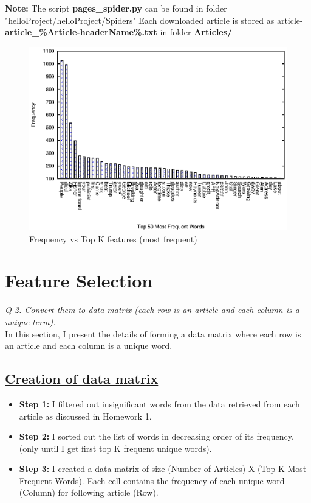 \documentclass[journal,onecolumn]{IEEEtran}
\begin{document}
\textbf{Note: } The script \textbf{pages\_spider.py} can be found in folder "helloProject/helloProject/Spiders"
Each downloaded article is stored as article- \textbf{article\_\%Article-headerName\%.txt} in folder \textbf{Articles/}


\begin{figure}[h]
\begin{center}
 \includegraphics[width = 6.5in, height = 3.5 in] {Plots/wordFreq_allArticles.eps}
 \caption {Frequency vs Top K features (most frequent) }
 \end{center}
\end{figure}



\section{\textbf{Feature Selection}}
\textit{Q 2. Convert them to data matrix (each row is an article and each column is a unique term).}\\

In this section, I present the details of forming a data matrix where each row is an article and each column is a unique word.

\subsection{\underline{Creation of data matrix}}

\begin{itemize}[label={}]

\item \textbf{Step 1: }  I filtered out insignificant words from the data retrieved from each article as discussed in Homework 1.

\item \textbf{Step 2:} I sorted out the list of words in decreasing order of its frequency. (only until I get first  top K frequent unique words).

\item \textbf{Step 3:} I created a data matrix of size (Number of Articles) X (Top K Most Frequent Words). Each cell contains the frequency of each unique word (Column) for following article (Row).

\end{itemize} 
\end{document}
